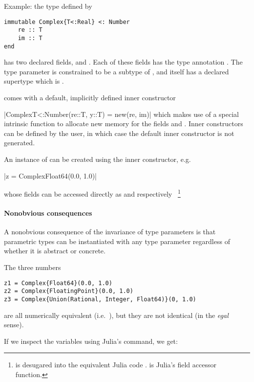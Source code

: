\documentclass[pldi]{sigplanconf-pldi15}
\begin{document}
Example: the  type defined by

\begin{verbatim}
immutable Complex{T<:Real} <: Number
    re :: T
    im :: T
end
\end{verbatim}

has two declared fields,  and . Each of these fields has the
type annotation . The type parameter  is constrained to be a
subtype of , and  itself has a declared supertype
which is .

 comes with a default, implicitly defined inner constructor

|Complex{T<:Number}(re::T, y::T) = new(re, im)|
%
which makes use of a special intrinsic function  to allocate new
memory for the fields  and . Inner constructors can be
defined by the user, in which case the default inner constructor is not
generated.

An instance of  can be created using the inner constructor, e.g.\

|z = Complex{Float64}(0.0, 1.0)|

whose fields can be accessed directly as  and  respectively~
\footnote{ is desugared into the equivalent Julia code .
 is Julia's field accessor function.}

\paragraph{Nonobvious consequences}

A nonobvious consequence of the invariance of type parameters is that
parametric types can be instantiated with any type parameter regardless of
whether it is abstract or concrete.

The three  numbers

\begin{verbatim}
z1 = Complex{Float64}(0.0, 1.0)
z2 = Complex{FloatingPoint}(0.0, 1.0)
z3 = Complex{Union(Rational, Integer, Float64)}(0, 1.0)
\end{verbatim}

are all numerically equivalent (i.e.\ ), but they are not
identical (in the \textit{egal} sense).

If we inspect the variables using Julia's  command, we get:
\end{document}
